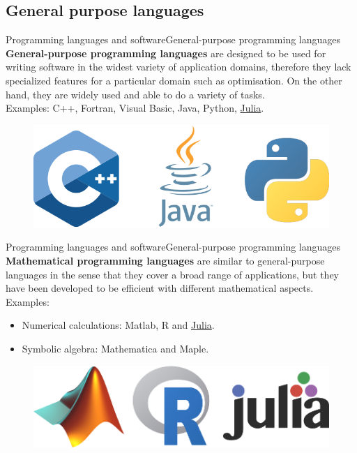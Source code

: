 \documentclass[handout]{beamer}
\begin{document}
\subsection{General purpose languages}
\begin{frame}{Programming languages and software}{General-purpose programming languages}
\textbf{General-purpose programming languages} are designed to be used for writing software in the widest variety of application domains, therefore they lack specialized features for a particular domain such as optimisation. On the other hand, they are widely used and able to do a variety of tasks.\\[6pt]

Examples: C++, Fortran, Visual Basic, Java, Python, \underline{Julia}.\\[12pt]

\begin{figure}
\begin{center}
\includegraphics[width=.60\textwidth]{GeneralLang.png}
\end{center}
\end{figure}

\end{frame}

\begin{frame}{Programming languages and software}{General-purpose programming languages}
\textbf{Mathematical programming languages} are similar to general-purpose languages in the sense that they cover a broad range of applications, but they have been developed to be efficient with different mathematical aspects. \\[6pt]

Examples:

\begin{itemize}
  \item Numerical calculations: Matlab, R and \underline{Julia}.
  \item Symbolic algebra: Mathematica and Maple.
\end{itemize}


\begin{figure}
\begin{center}
\includegraphics[width=.60\textwidth]{MathLang.png}
\end{center}
\end{figure}

\end{frame}
\end{document}
